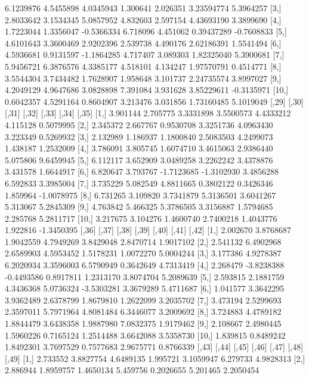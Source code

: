 \documentclass[12pt]{article}
\begin{document}
\begin{Schunk}
\begin{Soutput}
 [2,] 6.1239876 4.5455898  4.0345943 1.300641 2.026351 3.23594774  5.3964257
 [3,] 2.8033642 3.1534345  5.0857952 4.832603 2.597154 4.43693190  3.3899690
 [4,] 1.7223044 1.3356047 -0.5366334 6.718096 4.451062 0.39437289 -0.7608833
 [5,] 4.6101643 3.3600469  2.9202396 2.539738 4.490176 2.62186391  1.5541494
 [6,] 4.5936681 0.9131597 -1.1864285 4.717407 3.089303 1.82325040  5.3900681
 [7,] 5.9456721 6.3876576  4.3385177 4.518101 4.134247 1.97570791  0.4514771
 [8,] 3.5544304 3.7434482  1.7628907 1.958648 3.101737 2.24735574  3.8997027
 [9,] 4.2049129 4.9647686  3.0828898 7.391084 3.931628 3.85229611 -0.3135971
[10,] 0.6042357 4.5291164  0.8604907 3.213476 3.031856 1.73160485  5.1019049
         [,29]    [,30]      [,31]      [,32]     [,33]    [,34]      [,35]
 [1,] 3.901144 2.705775  3.3331898  3.5500573 4.4333212 4.115128  0.5079995
 [2,] 2.345372 2.667767  0.9530708  3.3251736 4.0963430 3.223349  0.5269932
 [3,] 2.132989 1.186937  1.1800840  2.5083503 4.2499073 1.438187  1.2532009
 [4,] 3.786091 3.805745  1.6074710  3.4615063 2.9386440 5.075806  9.6459945
 [5,] 6.112117 3.652909  3.0489258  3.2262242 3.4378876 3.431578  1.6644917
 [6,] 6.820647 3.793767 -1.7123685 -1.3102930 3.4856288 6.592833  3.3985004
 [7,] 3.735229 5.082549  4.8811665  0.3802122 0.3426346 1.859964 -1.0078975
 [8,] 6.731265 3.109820  3.7341879  5.3136501 3.6041267 5.313067  5.2845309
 [9,] 4.763842 5.466325  5.3786505  3.3156887 1.5794685 2.285768  5.2811717
[10,] 3.217675 3.104276  1.4600740  2.7400218 1.4043776 1.922816 -1.3450395
         [,36]      [,37]      [,38]     [,39]      [,40]     [,41]     [,42]
 [1,] 2.002670  3.8768687  1.9042559 4.7949269  3.8429048 2.8470714 1.9017102
 [2,] 2.541132  6.4902968  2.6589903 4.5953452  1.5178231 1.0072270 5.0004244
 [3,] 3.177386  4.9278387  6.2020934 3.3596003  6.5790949 0.3642649 4.7313419
 [4,] 2.268479 -3.8238388 -0.4493586 0.8917811  1.2313170 3.8074704 5.2089639
 [5,] 2.593815  2.1881759  4.3436368 5.0736324 -3.5303281 3.3679289 5.4711687
 [6,] 1.041577  3.3642295  3.9362489 2.6378799  1.8679810 1.2622099 3.2035702
 [7,] 3.473194  2.5299693  2.3597011 5.7971964  4.8081484 6.3446077 3.2009692
 [8,] 3.724883  4.4789182  1.8844479 3.6438358  1.9887980 7.0832375 1.9179462
 [9,] 2.108667  2.4980445  1.5960226 0.7165124  1.2514488 3.6642088 3.5358730
[10,] 1.839815  0.8489242  1.8492301 3.7697529  0.7577683 2.9675771 0.8766339
         [,43]      [,44]     [,45]    [,46]     [,47]     [,48]     [,49]
 [1,] 2.733552  3.8827754 4.6489135 1.995721 3.1059947  6.279733 4.9828313
 [2,] 2.886944  1.8959757 1.4650134 5.459756 0.2026655  5.201465 2.2050454

\end{Soutput}
\end{Schunk}
\end{document}
